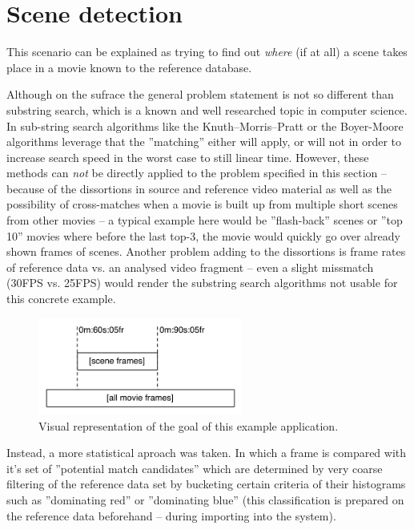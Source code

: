 \section{Scene detection}
\label{sec:scene-detection}
This scenario can be explained as trying to find out \textit{where} (if at all) a scene takes place in a movie known to the reference database. 

Although on the sufrace the general problem statement is not so different than substring search, which is a known and well researched topic in computer science. In sub-string search algorithms like the Knuth–Morris–Pratt \cite{kmp-string-search} or the Boyer-Moore \cite{boyer-string-search} algorithms leverage that the ''matching'' either will apply, or will not in order to increase search speed in the worst case to still linear time. However, these methods can \textit{not} be directly applied to the problem specified in this section -- because of the dissortions in source and reference video material as well as the possibility of cross-matches when a movie is built up from multiple short scenes from other movies -- a typical example here would be ''flash-back'' scenes or ''top 10'' movies where before the last top-3, the movie would quickly go over already shown frames of scenes. Another problem adding to the dissortions is frame rates of reference data vs. an analysed video fragment -- even a slight missmatch (30FPS vs. 25FPS) would render the substring search algorithms not usable for this concrete example.

\begin{figure}[ch!]
  \centering
  \includegraphics[width=0.6\textwidth]{img/frames-timeline-matching}
  \caption{Visual representation of the goal of this example application.}
\end{figure}

Instead, a more statistical aproach was taken. In which a frame is compared with it's set of ''potential match candidates'' which are determined by very coarse filtering of the reference data set by bucketing certain criteria of their histograms such as ''dominating red'' or ''dominating blue'' (this classification is prepared on the reference data beforehand -- during importing into the system).

